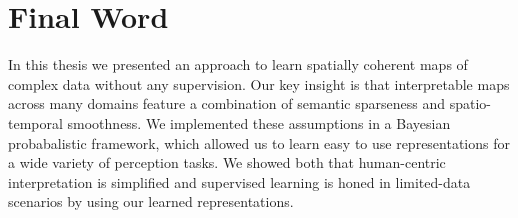 \section{Final Word}
In this thesis we presented an approach to learn spatially coherent maps of complex data without any supervision. Our key insight is that interpretable maps across many domains feature a combination of semantic sparseness and spatio-temporal smoothness. We implemented these assumptions in a Bayesian probabalistic framework, which allowed us to learn easy to use representations for a wide variety of perception tasks. We showed both that human-centric interpretation is simplified and supervised learning is honed in limited-data scenarios by using our learned representations.